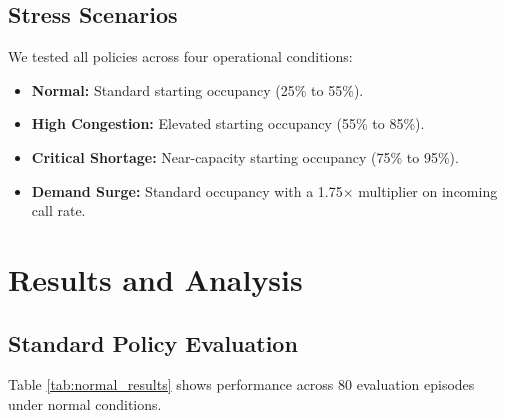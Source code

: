 \documentclass[11pt,a4paper]{article}
\begin{document}
\subsection{Stress Scenarios}
We tested all policies across four operational conditions:
\begin{itemize}[leftmargin=*]
    \item \textbf{Normal:} Standard starting occupancy (25\% to 55\%).
    \item \textbf{High Congestion:} Elevated starting occupancy (55\% to 85\%).
    \item \textbf{Critical Shortage:} Near-capacity starting occupancy (75\% to 95\%).
    \item \textbf{Demand Surge:} Standard occupancy with a 1.75$\times$ multiplier on incoming call rate.
\end{itemize}

\section{Results and Analysis}
\label{sec:results}

\subsection{Standard Policy Evaluation}
Table \ref{tab:normal_results} shows performance across 80 evaluation episodes under normal conditions.

\begin{table}[H]
    \centering
    \caption{Policy Performance Comparison under Normal Conditions.}
    \label{tab:normal_results}
\end{table}
\end{document}
